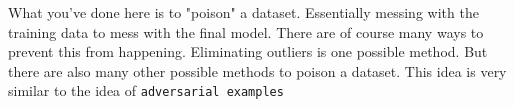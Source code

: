 \documentclass[11pt]{article}
\begin{document}
    What you've done here is to "poison" a dataset. Essentially messing with
the training data to mess with the final model. There are of course many
ways to prevent this from happening. Eliminating outliers is one
possible method. But there are also many other possible methods to
poison a dataset. This idea is very similar to the idea of
\texttt{adversarial\ examples}


    
    
    
    
\end{document}
